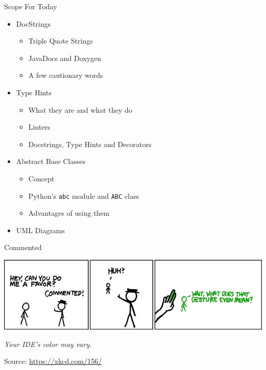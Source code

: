 
\begin{frame}[t,plain]
\titlepage
\end{frame}


\begin{frame}{Scope For Today}
%
\begin{itemize}
\item DocStrings
	\begin{itemize}
	\item Triple Quote Strings
	\item JavaDocs and Doxygen
	\item A few cautionary words
	\end{itemize}
\item Type Hints
	\begin{itemize}
	\item What they are and what they do
	\item Linters
	\item Docstrings, Type Hints and Decorators
	\end{itemize}
\item Abstract Base Classes
	\begin{itemize}
	\item Concept
	\item Python's \texttt{abc} module and \texttt{ABC} class
	\item Advantages of using them
	\end{itemize}
\item UML Diagrams
\end{itemize}
%
\end{frame}


\begin{frame}{Commented}
%
\begin{center}
\includegraphics[width=.8\linewidth]{./gfx/15-xkcd-commented}

\vspace{12pt}
\emph{Your IDE's color may vary.}

\vspace{12pt}
Source: \url{https://xkcd.com/156/}
\end{center}
%
\end{frame}

